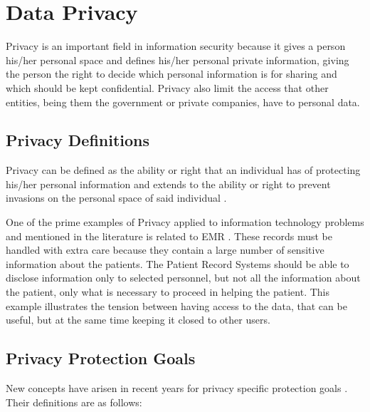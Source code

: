 \section{Data Privacy} 
\label{sec:DataPrivacy}

Privacy is an important field in information security because it gives a person his/her personal space and defines his/her personal private information, giving the person the right to decide which personal information is for sharing and which should be kept confidential. Privacy also limit the access that other entities, being them the government or private companies, have to personal data.


\subsection{Privacy Definitions}
\label{ssec:PrivacyDefinitions}


Privacy can be defined as the ability or right that an individual has of protecting his/her personal information and extends to the ability or right to prevent invasions on the personal space of said individual \cite{anderson2008security}.

One of the prime examples of Privacy applied to information technology problems and mentioned in the literature is related to \ac{EMR} \cite{Lu2014}. These records must be handled with extra care because they contain a large number of sensitive information about the patients. The Patient Record Systems should be able to disclose information only to selected personnel, but not all the information about the patient, only what is necessary to proceed in helping the patient. This example illustrates the tension between having access to the data, that can be useful, but at the same time keeping it closed to other users.



\subsection{Privacy Protection Goals}
\label{ssec:PrivacyProtectionGoals}

New concepts have arisen in recent years for privacy specific protection goals \cite{Danezis2015}. Their definitions are as follows:

